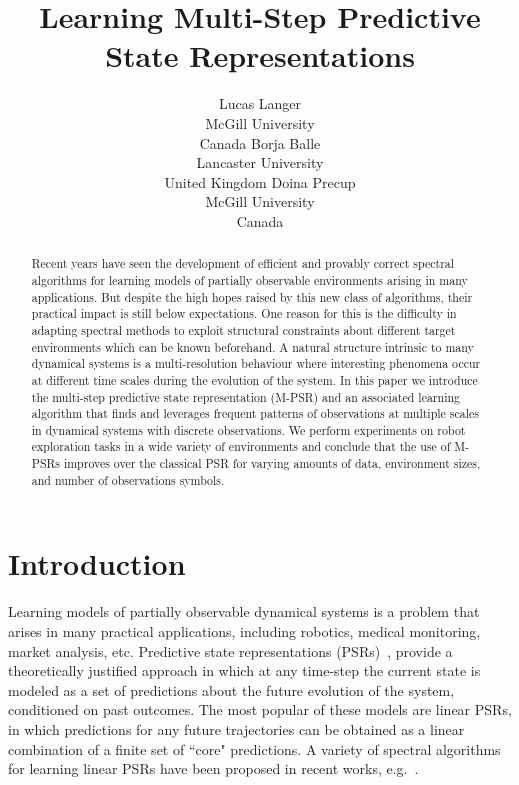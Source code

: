 \documentclass[letterpaper]{article}
\title{Learning Multi-Step Predictive State Representations}
\author{Lucas Langer \\ 
McGill University \\
Canada
\And
Borja Balle \\
Lancaster University \\
United Kingdom
\And
Doina Precup \\
McGill University \\
Canada}
\begin{document}
\maketitle

\begin{abstract}
Recent years have seen the development of efficient and provably correct spectral algorithms for learning models of partially observable environments arising in many applications. But despite the high hopes raised by this new class of algorithms, their practical impact is still below expectations. One reason for this is the difficulty in adapting spectral methods to exploit structural constraints about different target environments which can be known beforehand. A natural structure intrinsic to many dynamical systems is a multi-resolution behaviour where interesting phenomena occur at different time scales during the evolution of the system. In this paper we introduce the multi-step predictive state representation (M-PSR) and an associated learning algorithm that finds and leverages frequent patterns of observations at multiple scales in dynamical systems with discrete observations. We perform experiments on robot exploration tasks in a wide variety of environments and conclude that the use of M-PSRs improves over the classical PSR for varying amounts of data, environment sizes, and number of observations symbols.
\end{abstract}

\section{Introduction}

Learning models of partially observable dynamical systems is a problem that arises in many practical applications, including robotics, medical monitoring, market analysis, etc.  Predictive state representations (PSRs)~\cite{littmanpsr,singh04,rosencrantz04}, provide a theoretically justified approach in which at any time-step the current state is modeled as a set of predictions about the future evolution of the system, conditioned on past outcomes.  The most popular of these models are linear PSRs, in which predictions for any future trajectories can be obtained as a linear combination of a finite set of ``core" predictions. A variety of spectral algorithms for learning linear PSRs have been proposed in recent works, e.g.~\cite{bootspsr,Hamilton2013}.
\end{document}
